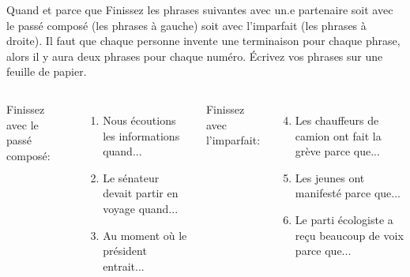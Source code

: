 \begin{frame}{Quand et parce que}
  Finissez les phrases suivantes avec un.e partenaire soit avec le passé composé (les phrases à gauche) soit avec l'imparfait (les phrases à droite).
  Il faut que chaque personne invente une terminaison pour chaque phrase, alors il y aura \alert{deux} phrases pour chaque numéro.
  Écrivez vos phrases sur une feuille de papier.
  \vspace{0.25cm}
  \begin{columns}
      Finissez avec le passé composé:
      \begin{enumerate}
        \item Nous écoutions les informations quand...
        \item Le sénateur devait partir en voyage quand...
        \item Au moment où le président entrait...
      \end{enumerate}
      Finissez avec l'imparfait:
      \begin{enumerate}
        \setcounter{enumi}{3}
        \item Les chauffeurs de camion ont fait la grève parce que...
        \item Les jeunes ont manifesté parce que...
        \item Le parti écologiste a reçu beaucoup de voix parce que...
      \end{enumerate}
  \end{columns}
\end{frame}